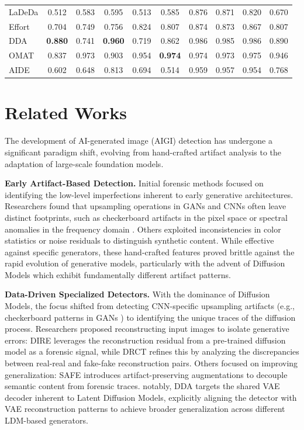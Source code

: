 \documentclass[sigconf,screen]{acmart}
\theoremstyle{plain}
\theoremstyle{definition}
\theoremstyle{remark}
\begin{document}
\begin{table}[ht]
{\begin{tabular}{l|cccccccc|c}
LaDeDa \cite{cavia2024real} & 0.512 & 0.583 & 0.595 & 0.513 & 0.585 & 0.876 & 0.871 & 0.820 & 0.670 \\
Effort \cite{yan2024orthogonal} & 0.704 & 0.749 & 0.756 & 0.824 & 0.807 & 0.874 & 0.873 & 0.867 & 0.807 \\
DDA \cite{chen2025dual} & \textbf{0.880} & 0.741 & \textbf{0.960} & 0.719 & 0.862 & 0.986 & 0.985 & 0.986 & 0.890 \\
OMAT \cite{zhou2025breaking} & 0.837 & 0.973 & 0.903 & 0.954 & \textbf{0.974} & 0.974 & 0.973 & 0.975 & 0.946 \\
AIDE \cite{yan2024sanity} & 0.602 & 0.648 & 0.813 & 0.694 & 0.514 & 0.959 & 0.957 & 0.954 & 0.768 \\
\bottomrule
\end{tabular}
}
\end{table}

\section{Related Works}
\label{sec:evolution}

The development of AI-generated image (AIGI) detection has undergone a significant paradigm shift, evolving from hand-crafted artifact analysis to the adaptation of large-scale foundation models.

\textbf{Early Artifact-Based Detection.}
Initial forensic methods focused on identifying the low-level imperfections inherent to early generative architectures. Researchers found that upsampling operations in GANs and CNNs often leave distinct footprints, such as checkerboard artifacts in the pixel space \cite{odena2016deconvolution} or spectral anomalies in the frequency domain \cite{frank2020leveraging}. Others exploited inconsistencies in color statistics \cite{mccloskey2019detecting} or noise residuals \cite{cozzolino2019noiseprint} to distinguish synthetic content. While effective against specific generators, these hand-crafted features proved brittle against the rapid evolution of generative models, particularly with the advent of Diffusion Models which exhibit fundamentally different artifact patterns.

\textbf{Data-Driven Specialized Detectors.}
With the dominance of Diffusion Models, the focus shifted from detecting CNN-specific upsampling artifacts (e.g., checkerboard patterns in GANs \cite{wang2020cnn}) to identifying the unique traces of the diffusion process.
Researchers proposed reconstructing input images to isolate generative errors: DIRE \cite{wang2023dire} leverages the reconstruction residual from a pre-trained diffusion model as a forensic signal, while DRCT \cite{chen2024drct} refines this by analyzing the discrepancies between real-real and fake-fake reconstruction pairs.
Others focused on improving generalization: SAFE \cite{li2025improving} introduces artifact-preserving augmentations to decouple semantic content from forensic traces. notably, DDA \cite{chen2025dual} targets the shared VAE decoder inherent to Latent Diffusion Models, explicitly aligning the detector with VAE reconstruction patterns to achieve broader generalization across different LDM-based generators.
\end{document}
